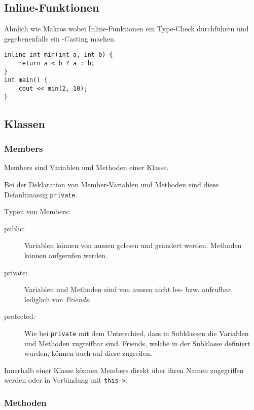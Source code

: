 \documentclass{article}
\newenvironment{code}
	{\begin{shaded}\vspace{-2.2mm}} 
	{\vspace{-5.0mm}\end{shaded}}
\begin{document}
\begin{multicols*}{3}
		\subsection{Inline-Funktionen} %
			Ähnlich wie Makros wobei Inline-Funktionen ein Type-Check durchführen und gegebenenfalls ein -Casting machen.
			
			\begin{code}
				\begin{lstlisting}[style=list]
inline int min(int a, int b) {
	return a < b ? a : b;
}
int main() {
	cout << min(2, 10);
}
				\end{lstlisting}
			\end{code}
		
		\subsection{Klassen} %
			\subsubsection{Members} %
				Members sind Variablen und Methoden einer Klasse.
				
				Bei der Deklaration von Member-Variablen und Methoden sind diese Defaultmässig \lstinline!private!.
			
				Typen von Members:
				\begin{description}
					\item[public:] Variablen können von aussen gelesen und geändert werden. Methoden können aufgerufen werden.
					\item[private:] Variablen und Methoden sind von aussen nicht les- bzw. aufrufbar, lediglich von \emph{Friends}.
					\item[protected:] Wie bei \lstinline!private! mit dem Unterschied, dass in Subklassen die Variablen und Methoden zugreifbar sind. Friends, welche in der Subklasse definiert wurden, können auch auf diese zugreifen.
				\end{description}
				
				Innerhalb einer Klasse können Members direkt über ihren Namen zugegriffen werden oder in Verbindung mit \lstinline!this->!.
				
			
			\subsubsection{Methoden} %
				

\end{multicols*}
\end{document}
